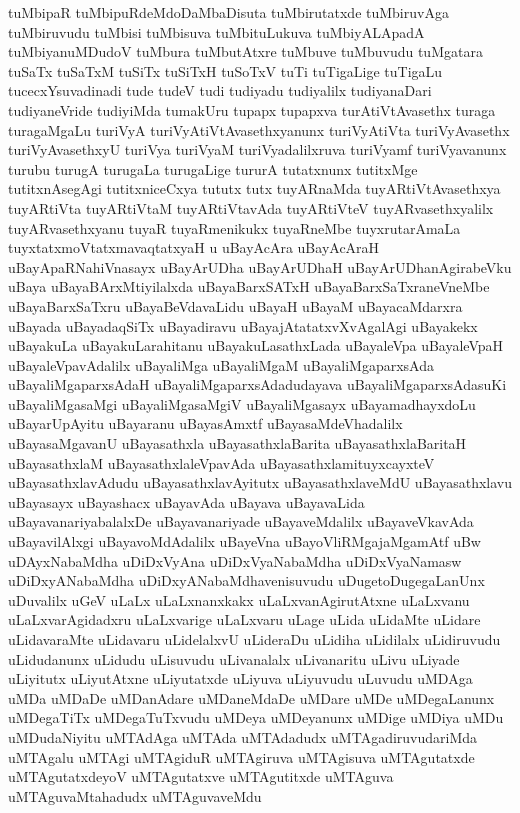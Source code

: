 {tuMbipaR
tuMbipuRdeMdoDaMbaDisuta
tuMbirutatxde
tuMbiruvAga
tuMbiruvudu
tuMbisi
tuMbisuva
tuMbituLukuva
tuMbiyALApadA
tuMbiyanuMDudoV
tuMbura
tuMbutAtxre
tuMbuve
tuMbuvudu
tuMgatara
tuSaTx
tuSaTxM
tuSiTx
tuSiTxH
tuSoTxV
tuTi
tuTigaLige
tuTigaLu
tucecxYsuvadinadi
tude
tudeV
tudi
tudiyadu
tudiyalilx
tudiyanaDari
tudiyaneVride
tudiyiMda
tumakUru
tupapx
tupapxva
turAtiVtAvasethx
turaga
turagaMgaLu
turiVyA
turiVyAtiVtAvasethxyanunx
turiVyAtiVta
turiVyAvasethx
turiVyAvasethxyU
turiVya
turiVyaM
turiVyadalilxruva
turiVyamf
turiVyavanunx
turubu
turugA
turugaLa
turugaLige
tururA
tutatxnunx
tutitxMge
tutitxnAsegAgi
tutitxniceCxya
tututx
tutx
tuyARnaMda
tuyARtiVtAvasethxya
tuyARtiVta
tuyARtiVtaM
tuyARtiVtavAda
tuyARtiVteV
tuyARvasethxyalilx
tuyARvasethxyanu
tuyaR
tuyaRmenikukx
tuyaRneMbe
tuyxrutarAmaLa
tuyxtatxmoVtatxmavaqtatxyaH
u
uBayAcAra
uBayAcAraH
uBayApaRNahiVnasayx
uBayArUDha
uBayArUDhaH
uBayArUDhanAgirabeVku
uBaya
uBayaBArxMtiyilalxda
uBayaBarxSATxH
uBayaBarxSaTxraneVneMbe
uBayaBarxSaTxru
uBayaBeVdavaLidu
uBayaH
uBayaM
uBayacaMdarxra
uBayada
uBayadaqSiTx
uBayadiravu
uBayajAtatatxvXvAgalAgi
uBayakekx
uBayakuLa
uBayakuLarahitanu
uBayakuLasathxLada
uBayaleVpa
uBayaleVpaH
uBayaleVpavAdalilx
uBayaliMga
uBayaliMgaM
uBayaliMgaparxsAda
uBayaliMgaparxsAdaH
uBayaliMgaparxsAdadudayava
uBayaliMgaparxsAdasuKi
uBayaliMgasaMgi
uBayaliMgasaMgiV
uBayaliMgasayx
uBayamadhayxdoLu
uBayarUpAyitu
uBayaranu
uBayasAmxtf
uBayasaMdeVhadalilx
uBayasaMgavanU
uBayasathxla
uBayasathxlaBarita
uBayasathxlaBaritaH
uBayasathxlaM
uBayasathxlaleVpavAda
uBayasathxlamituyxcayxteV
uBayasathxlavAdudu
uBayasathxlavAyitutx
uBayasathxlaveMdU
uBayasathxlavu
uBayasayx
uBayashacx
uBayavAda
uBayava
uBayavaLida
uBayavanariyabalalxDe
uBayavanariyade
uBayaveMdalilx
uBayaveVkavAda
uBayavilAlxgi
uBayavoMdAdalilx
uBayeVna
uBayoVliRMgajaMgamAtf
uBw
uDAyxNabaMdha
uDiDxVyAna
uDiDxVyaNabaMdha
uDiDxVyaNamasw
uDiDxyANabaMdha
uDiDxyANabaMdhavenisuvudu
uDugetoDugegaLanUnx
uDuvalilx
uGeV
uLaLx
uLaLxnanxkakx
uLaLxvanAgirutAtxne
uLaLxvanu
uLaLxvarAgidadxru
uLaLxvarige
uLaLxvaru
uLage
uLida
uLidaMte
uLidare
uLidavaraMte
uLidavaru
uLidelalxvU
uLideraDu
uLidiha
uLidilalx
uLidiruvudu
uLidudanunx
uLidudu
uLisuvudu
uLivanalalx
uLivanaritu
uLivu
uLiyade
uLiyitutx
uLiyutAtxne
uLiyutatxde
uLiyuva
uLiyuvudu
uLuvudu
uMDAga
uMDa
uMDaDe
uMDanAdare
uMDaneMdaDe
uMDare
uMDe
uMDegaLanunx
uMDegaTiTx
uMDegaTuTxvudu
uMDeya
uMDeyanunx
uMDige
uMDiya
uMDu
uMDudaNiyitu
uMTAdAga
uMTAda
uMTAdadudx
uMTAgadiruvudariMda
uMTAgalu
uMTAgi
uMTAgiduR
uMTAgiruva
uMTAgisuva
uMTAgutatxde
uMTAgutatxdeyoV
uMTAgutatxve
uMTAgutitxde
uMTAguva
uMTAguvaMtahadudx
uMTAguvaveMdu
}
